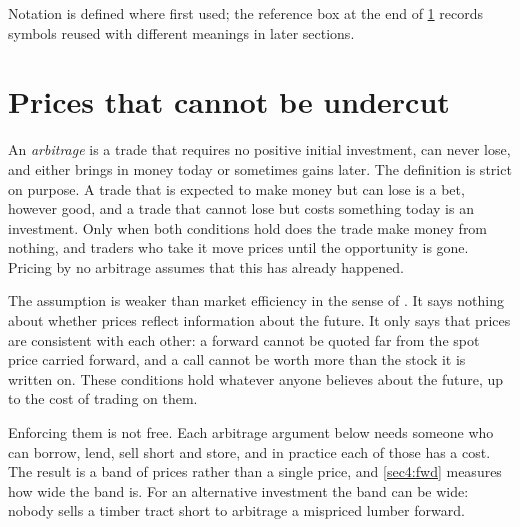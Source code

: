 \begin{chapterrefs}
\begin{keybox}
Notation is defined where first used; the reference box at the end of \cref{sec4:why} records
symbols reused with different meanings in later sections.
\end{keybox}

\section{Prices that cannot be undercut}
\label{sec4:why}

An \emph{arbitrage} is a trade that requires no positive initial investment, can never lose, and
either brings in money today or sometimes gains later. The definition is strict on purpose. A trade that is expected to make money but can
lose is a bet, however good, and a trade that cannot lose but costs something today is an investment.
Only when both conditions hold does the trade make money from nothing, and traders who take it move
prices until the opportunity is gone. Pricing by no arbitrage assumes that this has already happened.

The assumption is weaker than market efficiency in the sense of \textcite{fama1970}. It says nothing
about whether prices reflect information about the future. It only says that prices are consistent
with each other: a forward cannot be quoted far from the spot price carried forward, and a call
cannot be worth more than the stock it is written on. These conditions hold whatever anyone believes
about the future, up to the cost of trading on them.

Enforcing them is not free. Each arbitrage argument below needs someone who can borrow, lend, sell
short and store, and in practice each of those has a cost. The result is a band of prices rather than
a single price, and \cref{sec4:fwd} measures how wide the band is. For an alternative investment the
band can be wide: nobody sells a timber tract short to arbitrage a mispriced lumber forward.


\end{chapterrefs}
